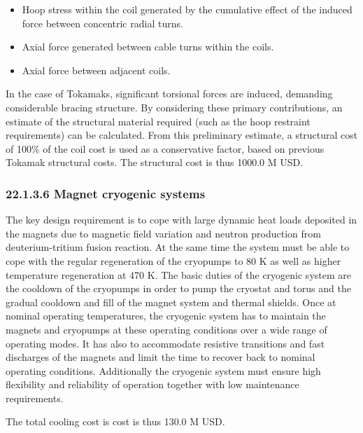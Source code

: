 \begin{itemize}
    \item Hoop stress within the coil generated by the cumulative effect of the induced force between concentric radial turns.
    \item Axial force generated between cable turns within the coils. 
    \item Axial force between adjacent coils.
\end{itemize}


In the case of Tokamaks, significant torsional forces are induced, demanding considerable bracing structure. By considering these primary contributions, an estimate of the structural material required (such as the hoop restraint requirements) can be calculated. From this preliminary estimate, a structural cost of 100\% of the coil cost is used as a conservative factor, based on previous Tokamak structural costs. The structural cost is thus 1000.0 M USD.


\subsubsection*{22.1.3.6 Magnet cryogenic systems}

The key design requirement is to cope with large dynamic heat loads deposited in the
magnets due to magnetic field variation and neutron production from deuterium-tritium
fusion reaction. At the same time the system must be able to cope with the regular
regeneration of the cryopumps to 80 K as well as higher temperature regeneration at 470 K.
The basic duties of the cryogenic system are the cooldown of the cryopumps in order
to pump the cryostat and torus and the gradual cooldown and fill of the magnet system and
thermal shields. Once at nominal operating temperatures, the cryogenic system has to
maintain the magnets and cryopumps at these operating conditions over a wide range of
operating modes. It has also to accommodate resistive transitions and fast discharges of the
magnets and limit the time to recover back to nominal operating conditions. Additionally
the cryogenic system must ensure high flexibility and reliability of operation together with
low maintenance requirements.

The total cooling cost is cost is thus 130.0 M USD.



